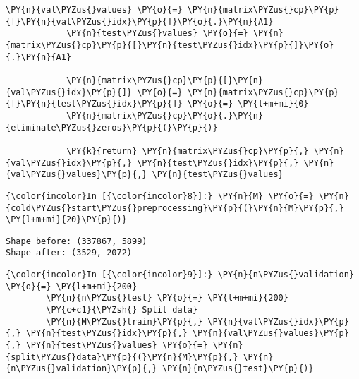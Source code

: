 \begin{Verbatim}[commandchars=\\\{\}]
            \PY{n}{val\PYZus{}values} \PY{o}{=} \PY{n}{matrix\PYZus{}cp}\PY{p}{[}\PY{n}{val\PYZus{}idx}\PY{p}{]}\PY{o}{.}\PY{n}{A1}
            \PY{n}{test\PYZus{}values} \PY{o}{=} \PY{n}{matrix\PYZus{}cp}\PY{p}{[}\PY{n}{test\PYZus{}idx}\PY{p}{]}\PY{o}{.}\PY{n}{A1}
            
            \PY{n}{matrix\PYZus{}cp}\PY{p}{[}\PY{n}{val\PYZus{}idx}\PY{p}{]} \PY{o}{=} \PY{n}{matrix\PYZus{}cp}\PY{p}{[}\PY{n}{test\PYZus{}idx}\PY{p}{]} \PY{o}{=} \PY{l+m+mi}{0}
            \PY{n}{matrix\PYZus{}cp}\PY{o}{.}\PY{n}{eliminate\PYZus{}zeros}\PY{p}{(}\PY{p}{)}
        
            \PY{k}{return} \PY{n}{matrix\PYZus{}cp}\PY{p}{,} \PY{n}{val\PYZus{}idx}\PY{p}{,} \PY{n}{test\PYZus{}idx}\PY{p}{,} \PY{n}{val\PYZus{}values}\PY{p}{,} \PY{n}{test\PYZus{}values}
\end{Verbatim}

    \begin{Verbatim}[commandchars=\\\{\}]
{\color{incolor}In [{\color{incolor}8}]:} \PY{n}{M} \PY{o}{=} \PY{n}{cold\PYZus{}start\PYZus{}preprocessing}\PY{p}{(}\PY{n}{M}\PY{p}{,} \PY{l+m+mi}{20}\PY{p}{)}
\end{Verbatim}

    \begin{Verbatim}[commandchars=\\\{\}]
Shape before: (337867, 5899)
Shape after: (3529, 2072)

    \end{Verbatim}

    \begin{Verbatim}[commandchars=\\\{\}]
{\color{incolor}In [{\color{incolor}9}]:} \PY{n}{n\PYZus{}validation} \PY{o}{=} \PY{l+m+mi}{200}
        \PY{n}{n\PYZus{}test} \PY{o}{=} \PY{l+m+mi}{200}
        \PY{c+c1}{\PYZsh{} Split data}
        \PY{n}{M\PYZus{}train}\PY{p}{,} \PY{n}{val\PYZus{}idx}\PY{p}{,} \PY{n}{test\PYZus{}idx}\PY{p}{,} \PY{n}{val\PYZus{}values}\PY{p}{,} \PY{n}{test\PYZus{}values} \PY{o}{=} \PY{n}{split\PYZus{}data}\PY{p}{(}\PY{n}{M}\PY{p}{,} \PY{n}{n\PYZus{}validation}\PY{p}{,} \PY{n}{n\PYZus{}test}\PY{p}{)}
\end{Verbatim}

